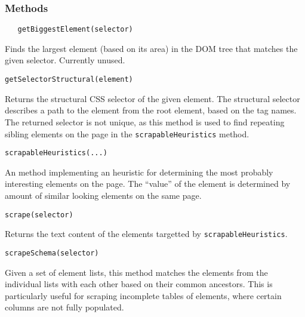 \subsubsection{Methods}

\verb|   getBiggestElement(selector)|
\smallskip

Finds the largest element (based on its area) in the DOM tree that matches the given selector.
Currently unused.

\emptyline
\verb|getSelectorStructural(element)|
\smallskip

Returns the structural \acs{CSS} selector of the given element. 
The structural selector describes a path to the element from the root element, based on the tag names.
The returned selector is not unique, as this method is used to find repeating sibling elements on the page in the \texttt{scrapableHeuristics} method.

\emptyline
\verb|scrapableHeuristics(...)|
\smallskip

An method implementing an heuristic for determining the most probably interesting elements on the page.
The ``value'' of the element is determined by amount of similar looking elements on the same page.

\emptyline
\verb|scrape(selector)|
\smallskip

Returns the text content of the elements targetted by \texttt{scrapableHeuristics}.

\emptyline
\verb|scrapeSchema(selector)|
\smallskip

Given a set of element lists, this method matches the elements from the individual lists with each other based on their common ancestors.
This is particularly useful for scraping incomplete tables of elements, where certain columns are not fully populated.